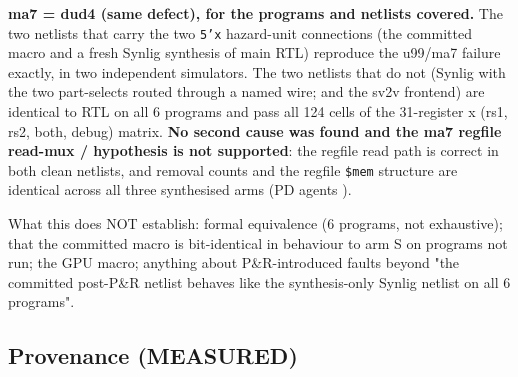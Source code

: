 \begin{record}

\textbf{ma7 = dud4 (same defect), for the programs and netlists
covered.} The two netlists that carry the two \texttt{5'x} hazard-unit
connections (the committed macro and a fresh Synlig synthesis of main
RTL) reproduce the u99/ma7 failure exactly, in two independent
simulators. The two netlists that do not (Synlig with the two
part-selects routed through a named wire; and the sv2v frontend) are
identical to RTL on all 6 programs and pass all 124 cells of the
31-register x (rs1, rs2, both, debug) matrix. \textbf{No second cause
was found and the ma7 regfile read-mux /  hypothesis
is not supported}: the regfile read path is correct in both clean
netlists, and  removal counts and the regfile
\texttt{\$mem} structure are identical across all three synthesised arms
(PD agent\textquotesingle s ).

What this does NOT establish: formal equivalence (6 programs, not
exhaustive); that the committed macro is bit-identical in behaviour to
arm S on programs not run; the GPU macro; anything about P\&R-introduced
faults beyond "the committed post-P\&R netlist behaves like the
synthesis-only Synlig netlist on all 6 programs".

\end{record}

\subsection{Provenance (MEASURED)}\label{cr:defect:asap7-cpu-synlig-ma7:provenance-measured}

